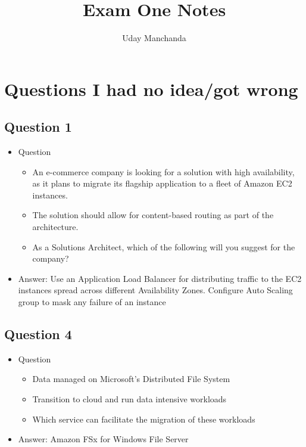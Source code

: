 \documentclass[]{scrartcl}
\title{Exam One Notes}
\author{Uday Manchanda}
\begin{document}
\maketitle

\section{Questions I had no idea/got wrong}

\subsection{Question 1}
\begin{itemize}
	\item Question
	\begin{itemize}
		\item An e-commerce company is looking for a solution with high availability, as it plans to migrate its flagship application to a fleet of Amazon EC2 instances. 
		\item The solution should allow for content-based routing as part of the architecture.
		\item As a Solutions Architect, which of the following will you suggest for the company?
	\end{itemize}
	\item Answer: Use an Application Load Balancer for distributing traffic to the EC2 instances spread across different Availability Zones. Configure Auto Scaling group to mask any failure of an instance
\end{itemize}

\subsection{Question 4}
\begin{itemize}
	\item Question
	\begin{itemize}
		\item Data managed on Microsoft's Distributed File System
		\item Transition to cloud and run data intensive workloads
		\item Which service can facilitate the migration of these workloads
	\end{itemize}
	\item Answer: Amazon FSx for Windows File Server
\end{itemize}
\end{document}
